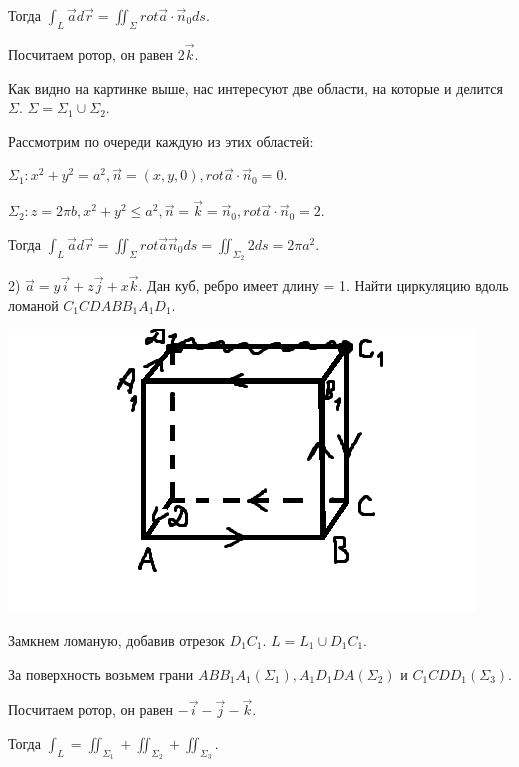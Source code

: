 \documentclass[12pt]{article}
\begin{document}
Тогда $\int_L \overrightarrow{a} d \overrightarrow{r} = \iint_{\Sigma} rot \overrightarrow{a} \cdot \overrightarrow{n}_0 ds$.\par
Посчитаем ротор, он равен $2 \overrightarrow{k}$.\par
Как видно на картинке выше, нас интересуют две области, на которые и делится $\Sigma$. $\Sigma = \Sigma_1 \cup \Sigma_2$.\par
Рассмотрим по очереди каждую из этих областей:\par
$\Sigma_1 : x^2 + y^2 = a^2, \overrightarrow{n} = (x,y,0), rot \overrightarrow{a} \cdot \overrightarrow{n}_0 = 0$.\par
$\Sigma_2 : z = 2 \pi b, x^2 + y^2 \leq a^2, \overrightarrow{n} = \overrightarrow{k} = \overrightarrow{n}_0, rot \overrightarrow{a} \cdot \overrightarrow{n}_0 = 2$.\par
Тогда $\int_L \overrightarrow{a} d \overrightarrow{r} = \iint_{\Sigma} rot \overrightarrow{a} \overrightarrow{n}_0 ds = \iint_{\Sigma_2} 2 ds = 2 \pi a^2$.\par
2) $\overrightarrow{a} = y \overrightarrow{i} + z \overrightarrow{j} + x \overrightarrow{k}$. Дан куб, ребро имеет длину = 1. Найти циркуляцию вдоль ломаной $C_1CDABB_1A_1D_1$.\par
\includegraphics{stokesExample2}\par
Замкнем ломаную, добавив отрезок $D_1C_1$. $L = L_1 \cup D_1C_1$.\par
За поверхность возьмем грани $ABB_1A_1 (\Sigma_1), A_1D_1DA(\Sigma_2)$ и $C_1CDD_1 (\Sigma_3)$.\par
Посчитаем ротор, он равен $-\overrightarrow{i}-\overrightarrow{j}-\overrightarrow{k}$.\par
Тогда $\int_L = \iint_{\Sigma_1} + \iint_{\Sigma_2} + \iint_{\Sigma_3}$.\par
\end{document}
